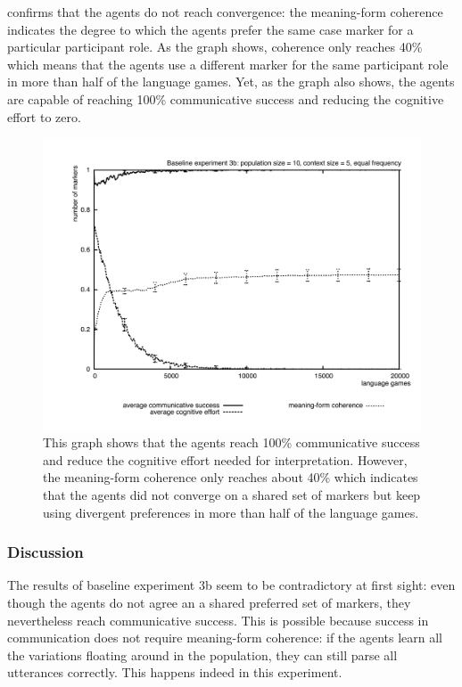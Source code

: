  confirms that the agents do not reach convergence: the meaning-form coherence indicates the degree to which the agents prefer the same case marker for a particular participant role. As the graph shows, coherence only reaches 40\% which means that the agents use a different marker for the same participant role in more than half of the language games. Yet, as the graph also shows, the agents are capable of reaching 100\% communicative success  and reducing the cognitive effort to zero.
\begin{figure}[t]
\centerline{\includegraphics[width=\textwidth]{Chapter3/figs/graph-base3-effort3b}}
  \caption[Baseline experiment 3b: success, effort and coherence]{This graph shows that the agents reach 100\% communicative success and reduce the cognitive effort needed for interpretation. However, the meaning-form coherence only reaches about 40\% which indicates that the agents did not converge on a shared set of markers but keep using divergent preferences in more than half of the language games.}
   \label{f:base3-effort3b}
\end{figure}


\subsubsection{Discussion}
 The results of baseline experiment 3b seem to be contradictory at first sight: even though the agents do not agree an a shared preferred set of markers, they nevertheless reach communicative success. This is possible because success in communication does not require meaning-form coherence: if the agents learn all the variations floating around in the population, they can still parse all utterances correctly. This happens indeed in this experiment.

